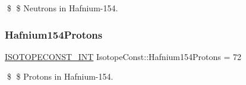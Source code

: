 \$ \$ Neutrons in Hafnium-\/154. \mbox{\label{group___isotope_const-_hafnium-_hf154_gaeae7ddfe97c8153fb5def7b111028ec8}} 
\subsubsection{\texorpdfstring{Hafnium154\+Protons}{Hafnium154Protons}}
{\footnotesize\ttfamily \mbox{\hyperlink{group___isotope_const-_macros_ga5f18360b3e99483a35c32d789e62621c}{I\+S\+O\+T\+O\+P\+E\+C\+O\+N\+S\+T\+\_\+\+I\+NT}} Isotope\+Const\+::\+Hafnium154\+Protons = 72}

\$ \$ Protons in Hafnium-\/154. 